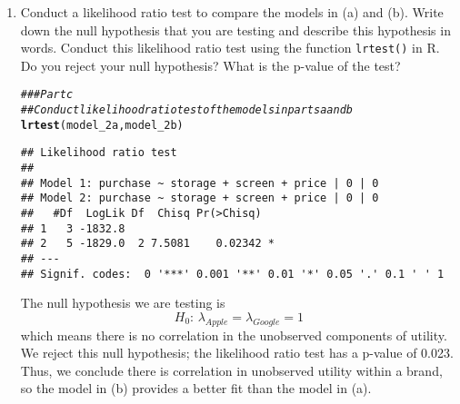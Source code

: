\documentclass[11pt,letterpaper]{article}\usepackage[]{graphicx}\usepackage[]{color}
\makeatletter
\newcommand{\hlcom}[1]{\textcolor[rgb]{0.678,0.584,0.686}{\textit{#1}}}%
\newcommand{\hlstd}[1]{\textcolor[rgb]{0.345,0.345,0.345}{#1}}%
\newcommand{\hlkwd}[1]{\textcolor[rgb]{0.737,0.353,0.396}{\textbf{#1}}}%
\newenvironment{kframe}{%
 \def\at@end@of@kframe{}%
 \ifinner\ifhmode%
  \def\at@end@of@kframe{\end{minipage}}%
  \begin{minipage}{\columnwidth}%
 \fi\fi%
 \def\FrameCommand##1{\hskip\@totalleftmargin \hskip-\fboxsep
 \colorbox{shadecolor}{##1}\hskip-\fboxsep
     \hskip-\linewidth \hskip-\@totalleftmargin \hskip\columnwidth}%
 \MakeFramed {\advance\hsize-\width
   \@totalleftmargin\z@ \linewidth\hsize
   \@setminipage}}%
 {\par\unskip\endMakeFramed%
 \at@end@of@kframe}
\newenvironment{knitrout}{}{} %
\makeatother
\begin{document}
\begin{enumerate}[label=\alph*., leftmargin=*]
	\item Conduct a likelihood ratio test to compare the models in (a) and (b). Write down the null hypothesis that you are testing and describe this hypothesis in words. Conduct this likelihood ratio test using the function \texttt{lrtest()} in R. Do you reject your null hypothesis? What is the p-value of the test?

\begin{knitrout}
\color{fgcolor}\begin{kframe}
\begin{alltt}
\hlcom{### Part c}
\hlcom{## Conduct likelihood ratio test of the models in parts a and b}
\hlkwd{lrtest}\hlstd{(model_2a, model_2b)}
\end{alltt}
\begin{verbatim}
## Likelihood ratio test
## 
## Model 1: purchase ~ storage + screen + price | 0 | 0
## Model 2: purchase ~ storage + screen + price | 0 | 0
##   #Df  LogLik Df  Chisq Pr(>Chisq)  
## 1   3 -1832.8                       
## 2   5 -1829.0  2 7.5081    0.02342 *
## ---
## Signif. codes:  0 '***' 0.001 '**' 0.01 '*' 0.05 '.' 0.1 ' ' 1
\end{verbatim}
\end{kframe}
\end{knitrout}

	The null hypothesis we are testing is
	$$H_0 \text{: } \lambda_{Apple} = \lambda_{Google} = 1$$
	which means there is no correlation in the unobserved components of utility. We reject this null hypothesis; the likelihood ratio test has a p-value of 0.023. Thus, we conclude there is correlation in unobserved utility within a brand, so the model in (b) provides a better fit than the model in (a).


\end{enumerate}
\end{document}
